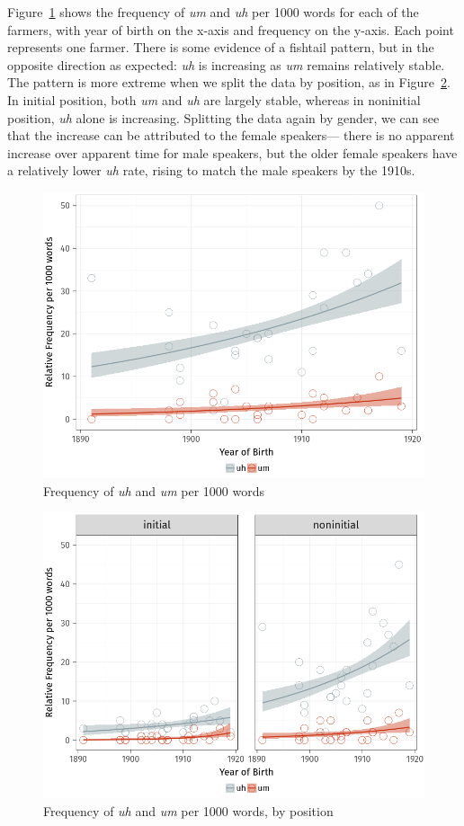 \documentclass[11pt]{article}
\begin{document}
Figure~\ref{fig:relfreq} shows the frequency of \emph{um} and \emph{uh} per 1000
words for each of the farmers, with year of birth on the x-axis and frequency
on the y-axis.
Each point represents one farmer.
There is some evidence of a fishtail pattern, but in the opposite direction as
expected: \emph{uh} is increasing as \emph{um} remains relatively stable.
The pattern is more extreme when we split the data by position, as in
Figure~\ref{fig:relfreqposition}.
In initial position, both \emph{um} and \emph{uh} are largely stable, whereas in
noninitial position, \emph{uh} alone is increasing.
Splitting the data again by gender, we can see that the increase can be
attributed to the female speakers---%
there is no apparent increase over apparent time for male speakers,
but the older female speakers have a relatively lower \emph{uh} rate, rising to
match the male speakers by the 1910s.

\begin{figure}[htpb]
    \centering
    \includegraphics[width=0.8\linewidth]{figures/relfreq.png}
    \caption{Frequency of \emph{uh} and \emph{um} per 1000 words}%
    \label{fig:relfreq}
\end{figure}

\begin{figure}[htpb]
    \centering
    \includegraphics[width=0.8\linewidth]{figures/relfreqposition.png}
    \caption{Frequency of \emph{uh} and \emph{um} per 1000 words, by position}%
    \label{fig:relfreqposition}
\end{figure}
\end{document}
